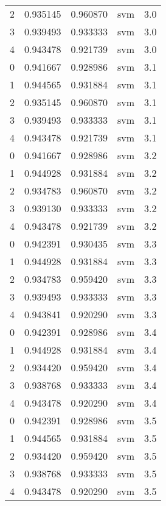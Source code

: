\begin{tabular}{rrrlr}
     2 & 0.935145 & 0.960870 &      svm &        3.0 \\
     3 & 0.939493 & 0.933333 &      svm &        3.0 \\
     4 & 0.943478 & 0.921739 &      svm &        3.0 \\
     0 & 0.941667 & 0.928986 &      svm &        3.1 \\
     1 & 0.944565 & 0.931884 &      svm &        3.1 \\
     2 & 0.935145 & 0.960870 &      svm &        3.1 \\
     3 & 0.939493 & 0.933333 &      svm &        3.1 \\
     4 & 0.943478 & 0.921739 &      svm &        3.1 \\
     0 & 0.941667 & 0.928986 &      svm &        3.2 \\
     1 & 0.944928 & 0.931884 &      svm &        3.2 \\
     2 & 0.934783 & 0.960870 &      svm &        3.2 \\
     3 & 0.939130 & 0.933333 &      svm &        3.2 \\
     4 & 0.943478 & 0.921739 &      svm &        3.2 \\
     0 & 0.942391 & 0.930435 &      svm &        3.3 \\
     1 & 0.944928 & 0.931884 &      svm &        3.3 \\
     2 & 0.934783 & 0.959420 &      svm &        3.3 \\
     3 & 0.939493 & 0.933333 &      svm &        3.3 \\
     4 & 0.943841 & 0.920290 &      svm &        3.3 \\
     0 & 0.942391 & 0.928986 &      svm &        3.4 \\
     1 & 0.944928 & 0.931884 &      svm &        3.4 \\
     2 & 0.934420 & 0.959420 &      svm &        3.4 \\
     3 & 0.938768 & 0.933333 &      svm &        3.4 \\
     4 & 0.943478 & 0.920290 &      svm &        3.4 \\
     0 & 0.942391 & 0.928986 &      svm &        3.5 \\
     1 & 0.944565 & 0.931884 &      svm &        3.5 \\
     2 & 0.934420 & 0.959420 &      svm &        3.5 \\
     3 & 0.938768 & 0.933333 &      svm &        3.5 \\
     4 & 0.943478 & 0.920290 &      svm &        3.5 \\

\end{tabular}
